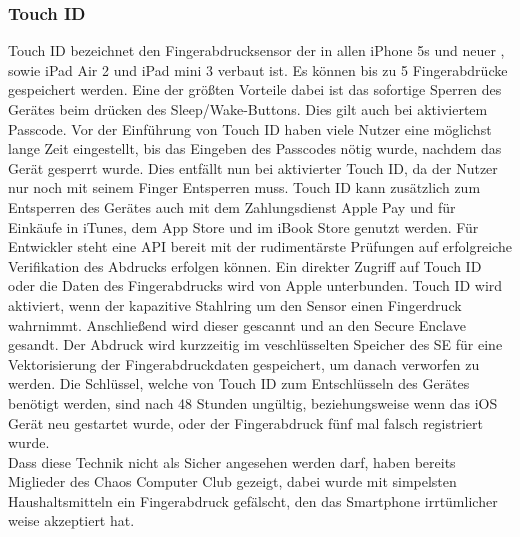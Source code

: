 	\subsubsection{Touch ID}\label{sec:touch_id}
		Touch ID bezeichnet den Fingerabdrucksensor der in allen iPhone 5s und neuer
		, sowie iPad Air 2 und iPad mini 3 verbaut ist. Es können bis zu 5
		Fingerabdrücke gespeichert werden. Eine der größten Vorteile dabei ist das
		sofortige Sperren des Gerätes beim drücken des Sleep/Wake-Buttons. Dies gilt
		auch bei aktiviertem Passcode. Vor der Einführung von Touch ID haben viele
		Nutzer eine möglichst lange Zeit eingestellt, bis das Eingeben des Passcodes
		nötig wurde, nachdem das Gerät gesperrt wurde. Dies entfällt nun bei
		aktivierter Touch ID, da der Nutzer nur noch mit seinem Finger Entsperren
		muss.
		Touch ID kann zusätzlich zum Entsperren des Gerätes auch mit dem Zahlungsdienst Apple
		Pay und für Einkäufe in iTunes, dem App Store und im iBook Store genutzt
		werden. Für Entwickler steht eine API bereit mit der rudimentärste
		Prüfungen auf erfolgreiche Verifikation des Abdrucks erfolgen können. Ein
		direkter Zugriff auf Touch ID oder die Daten des Fingerabdrucks wird von
		Apple unterbunden. Touch ID wird aktiviert, wenn der kapazitive Stahlring um
		den Sensor einen Fingerdruck wahrnimmt. Anschließend wird dieser gescannt und
		an den Secure Enclave gesandt. Der Abdruck wird kurzzeitig im veschlüsselten
		Speicher des SE für eine Vektorisierung der Fingerabdruckdaten gespeichert, um
		danach verworfen zu werden. Die Schlüssel, welche von Touch ID zum
		Entschlüsseln des Gerätes benötigt werden, sind nach 48 Stunden ungültig,
		beziehungsweise wenn das iOS Gerät neu gestartet wurde, oder der
		Fingerabdruck fünf mal falsch registriert wurde.\\
		Dass diese Technik nicht als Sicher angesehen werden darf, haben bereits
		Miglieder des Chaos Computer Club gezeigt\cite{CCCBreakTouch2015}, dabei 
		wurde mit simpelsten Haushaltsmitteln ein Fingerabdruck gefälscht, den das
		Smartphone irrtümlicher weise akzeptiert hat.
